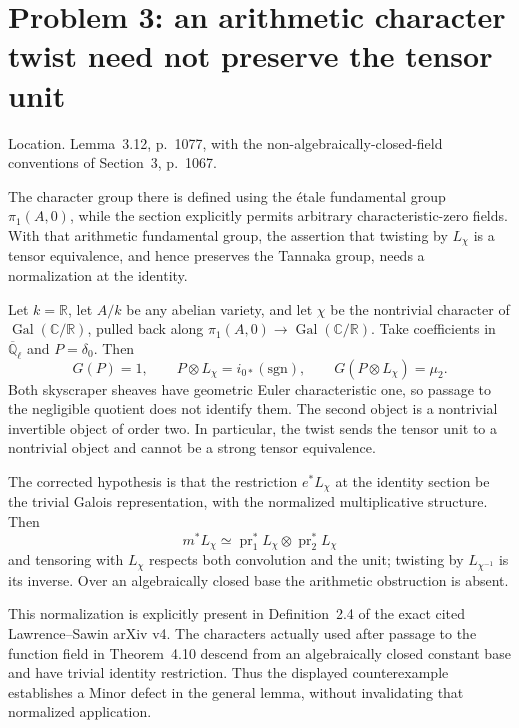 \documentclass[10pt]{article}
\begin{document}
\section*{Problem 3: an arithmetic character twist need not preserve the tensor unit}
Location. Lemma 3.12, p. 1077, with the non-algebraically-closed-field conventions of Section 3, p. 1067.\par
The character group there is defined using the étale fundamental group \(\pi_1(A,0)\), while the section explicitly permits arbitrary characteristic-zero fields. With that arithmetic fundamental group, the assertion that twisting by \(L_\chi\) is a tensor equivalence, and hence preserves the Tannaka group, needs a normalization at the identity.\par
Let \(k=\mathbb R\), let \(A/k\) be any abelian variety, and let \(\chi\) be the nontrivial character of \(\operatorname{Gal}(\mathbb C/\mathbb R)\), pulled back along \(\pi_1(A,0)\to\operatorname{Gal}(\mathbb C/\mathbb R)\). Take coefficients in \(\overline{\mathbb Q}_\ell\) and \(P=\delta_0\). Then \[G(P)=1,\qquad P\otimes L_\chi=i_{0*}(\mathrm{sgn}),\qquad
 G(P\otimes L_\chi)=\mu_2.\] Both skyscraper sheaves have geometric Euler characteristic one, so passage to the negligible quotient does not identify them. The second object is a nontrivial invertible object of order two. In particular, the twist sends the tensor unit to a nontrivial object and cannot be a strong tensor equivalence.\par
The corrected hypothesis is that the restriction \(e^*L_\chi\) at the identity section be the trivial Galois representation, with the normalized multiplicative structure. Then \[m^*L_\chi\simeq \operatorname{pr}_1^*L_\chi
                    \otimes\operatorname{pr}_2^*L_\chi\] and tensoring with \(L_\chi\) respects both convolution and the unit; twisting by \(L_{\chi^{-1}}\) is its inverse. Over an algebraically closed base the arithmetic obstruction is absent.\par
This normalization is explicitly present in Definition 2.4 of the exact cited Lawrence–Sawin arXiv v4. The characters actually used after passage to the function field in Theorem 4.10 descend from an algebraically closed constant base and have trivial identity restriction. Thus the displayed counterexample establishes a Minor defect in the general lemma, without invalidating that normalized application.\par
\end{document}
